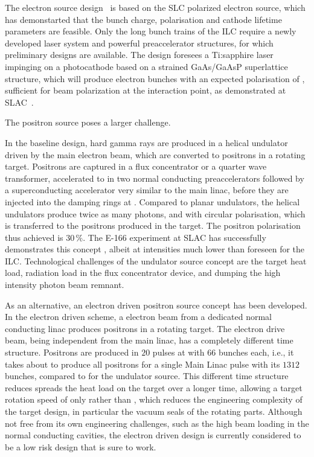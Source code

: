 The electron source design~\cite{Adolphsen:2013kya} is based on the SLC polarized electron source, which has demonstarted that the bunch charge, polarisation and cathode lifetime parameters are feasible.
Only the long bunch trains of the ILC require a newly developed laser system and powerful preaccelerator structures, for which preliminary designs are available.
The design foresees a Ti:sapphire laser impinging on a photocathode based on a strained GaAs/GaAsP superlattice
structure, which will produce electron bunches with an expected polarisation of ,
sufficient for  beam polarization at the interaction point, as demonstrated at SLAC~\cite{Alley:1995ia}.

The positron source poses a larger challenge. 

In the baseline design, hard gamma rays are produced in a helical undulator driven by the main electron beam, which are converted to positrons in a rotating target.
Positrons are captured in a flux concentrator or a quarter wave transformer, accelerated to  in two normal conducting preaccelerators followed by a superconducting accelerator very similar to the main linac, before they are injected into the damping rings at .
Compared to planar undulators, the helical undulators produce twice as many photons, and with circular polarisation, which is transferred to the positrons produced in the target.
The positron polarisation thus achieved is $30\,\%$.
The E-166 experiment at SLAC has successfully demonstrates this concept  \cite{Alexander:2009nb}, albeit at intensities much lower than foreseen for the ILC. 
Technological challenges of the undulator source concept are the target heat load, radiation load in the flux concentrator device, and dumping the high intensity photon beam remnant.

As an alternative, an electron driven positron source concept has been developed.
In the electron driven scheme, a  electron beam from a dedicated normal conducting linac produces positrons in a rotating target.
The electron drive beam, being independent from the main linac, has a completely different time structure. 
Positrons are produced in $20$ pulses at  with $66$ bunches each, i.e., it takes about  to produce all positrons for a single Main Linac pulse with its $1312$ bunches, compared to  for the undulator source.
This different time structure reduces spreads the heat load on the target over a longer time, allowing a target rotation speed of only  rather than , which reduces the engineering complexity of the target design, in particular the vacuum seals of the rotating parts.
Although not free from its own engineering challenges, such as the high beam loading in the normal conducting cavities, the electron driven design is currently considered to be a low risk design that is sure to work.

